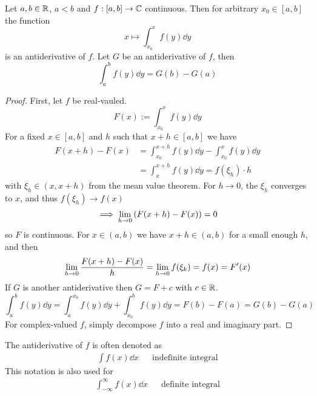 \documentclass[../../script.tex]{subfiles}
\begin{document}
\begin{thm}
    Let $a, b \in \mathbb{R}$, $a < b$ and $f: [a, b] \rightarrow \mathbb{C}$ continuous. Then for arbitrary $x_0 \in [a, b]$ the function 
    \[
        x \longmapsto \int_{x_0}^x f(y) \dd y
    \]
    is an antiderivative of $f$.
    Let $G$ be an antiderivative of $f$, then 
    \[
        \int_a^b f(y) \dd y = G(b) - G(a)
    \]
\end{thm}
\begin{proof}
    First, let $f$ be real-vauled.
    \begin{equation}
        F(x) := \int_{x_0}^x f(y) \dd y
    \end{equation}
    For a fixed $x \in [a, b]$ and $h$ such that $x + h \in [a, b]$ we have 
    \begin{equation}
        \begin{split}
            F(x + h) - F(x) &= \int_{x_0}^{x + h} f(y) \dd y - \int_{x_0}^x f(y) \dd y \\
            &= \int_x^{x+h} f(y) \dd y = f(\xi_h) \cdot h
        \end{split}
    \end{equation}
    with $\xi_h \in (x, x + h)$ from the mean value theorem. For $h \rightarrow 0$, the $\xi_h$ converges to $x$, and thus $f(\xi_h) \rightarrow f(x)$
    \begin{equation}
        \implies \lim_{h \rightarrow 0} \left( F(x + h) - F(x) \right) = 0
    \end{equation}
    so $F$ is continuous. For $x \in (a, b)$ we have $x + h \in (a, b)$ for a small enough $h$, and then 
    \begin{equation}
        \lim_{h \rightarrow 0} \frac{F(x + h) - F(x)}{h} = \lim_{h \rightarrow 0} f(\xi_k) = f(x) = F'(x)
    \end{equation}
    If $G$ is another antiderivative then $G = F + c$ with $c \in \mathbb{R}$.
    \begin{equation}
        \int_a^b f(y) \dd y = \int_a^{x_0} f(y) \dd y + \int_{x_0}^b f(y) \dd y = F(b) - F(a) = G(b) - G(a)
    \end{equation}
    For complex-valued $f$, simply decompose $f$ into a real and imaginary part.
\end{proof}

\begin{rem}
    The antiderivative of $f$ is often denoted as 
    \begin{align*}
        \int f(x) \dd x && \text{indefinite integral}
    \end{align*}
    This notation is also used for 
    \begin{align*}
        \int_{-\infty}^{\infty} f(x) \dd x && \text{definite integral}
    \end{align*}
\end{rem}
\end{document}
